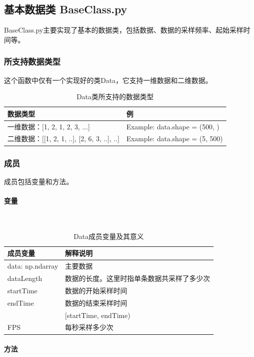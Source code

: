 \documentclass[cs4size,a4paper]{ctexart}
\newcommand{\subsubsubsection}[1]{\paragraph{#1}\mbox{}\\}
\numberwithin{equation}{section}
\numberwithin{table}{section}
\numberwithin{figure}{section}
\begin{document}
\subsection{基本数据类 BaseClass.py}

\colorbox{LetMeFlyGray}{BaseClass.py}主要实现了基本的数据类，包括数据、数据的采样频率、起始采样时间等。

\subsubsection{所支持数据类型}

这个函数中仅有一个实现好的类\colorbox{LetMeFlyGray}{Data}，它支持一维数据和二维数据。

\begin{table}[H]
\caption{Data类所支持的数据类型}
\centering
\begin{tabular}{l|l}
\toprule
数据类型 & 例\\
\midrule[2pt]
一维数据：[1, 2, 1, 2, 3, ...]  & Example: data.shape = (500, )\\
二维数据：[[1, 2, 1, ..], [2, 6, 3, ..], ..]  &Example: data.shape = (5, 500) \\
\bottomrule
\end{tabular}
\end{table}

\subsubsection{成员}

成员包括变量和方法。

\subsubsubsection{变量}

\begin{table}[H]
\caption{Data成员变量及其意义}
\centering
\begin{tabular}{l|l}
\toprule
成员变量 & 解释说明\\
\midrule[2pt]
data: np.ndarray & 主要数据\\
dataLength & 数据的长度。这里时指单条数据共采样了多少次\\
startTime & 数据的开始采样时间 \\
endTime & 数据的结束采样时间\\ & [startTime, endTime)\\
FPS & 每秒采样多少次\\
\bottomrule
\end{tabular}
\end{table}

\subsubsubsection{方法}
\end{document}
